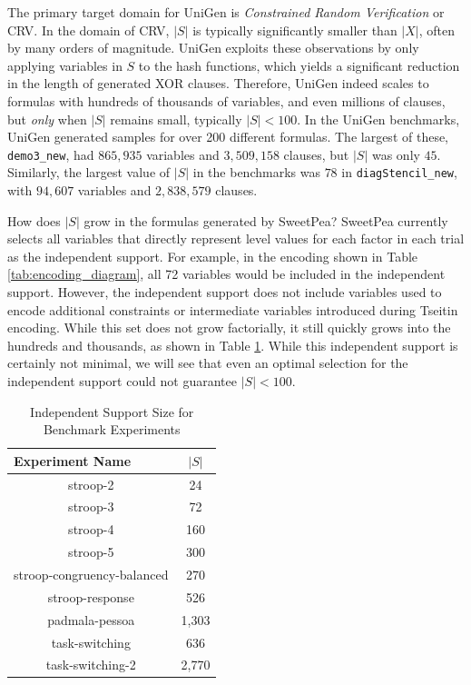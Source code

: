 The primary target domain for UniGen is \textit{Constrained Random Verification} or CRV. In the domain of CRV, $|S|$ is typically significantly smaller than $|X|$, often by many orders of magnitude. UniGen exploits these observations by only applying variables in $S$ to the hash functions, which yields a significant reduction in the length of generated XOR clauses. Therefore, UniGen indeed scales to formulas with hundreds of thousands of variables, and even millions of clauses, but \textit{only} when $|S|$ remains small, typically $|S| < 100$. In the UniGen benchmarks, UniGen generated samples for over 200 different formulas. The largest of these, \texttt{demo3\_new}, had $865,935$ variables and $3,509,158$ clauses, but $|S|$ was only $45$. Similarly, the largest value of $|S|$ in the benchmarks was $78$ in \texttt{diagStencil\_new}, with $94,607$ variables and $2,838,579$ clauses. \cite{chakraborty_parallel_2015}

How does $|S|$ grow in the formulas generated by SweetPea? SweetPea currently selects all variables that directly represent level values for each factor in each trial as the independent support. For example, in the encoding shown in Table \ref{tab:encoding_diagram}, all 72 variables would be included in the independent support. However, the independent support does not include variables used to encode additional constraints or intermediate variables introduced during Tseitin encoding. While this set does not grow factorially, it still quickly grows into the hundreds and thousands, as shown in Table \ref{tab:benchmark_experiments_support}. While this independent support is certainly not minimal, we will see that even an optimal selection for the independent support could not guarantee $|S| < 100$.

\begin{table}[b]
  \centering
  \caption{Independent Support Size for Benchmark Experiments}
\begin{tabular}{|c|c|}
\hline
\multicolumn{1}{|l|}{Experiment Name}  & $|S|$   \\ \hline
stroop-2                               & 24      \\ \hline
stroop-3                               & 72      \\ \hline
stroop-4                               & 160     \\ \hline
stroop-5                               & 300     \\ \hline
stroop-congruency-balanced             & 270     \\ \hline
stroop-response                        & 526     \\ \hline
padmala-pessoa                         & 1,303   \\ \hline
task-switching                         & 636     \\ \hline
task-switching-2                       & 2,770   \\ \hline
\end{tabular}
\label{tab:benchmark_experiments_support}%
\end{table}



